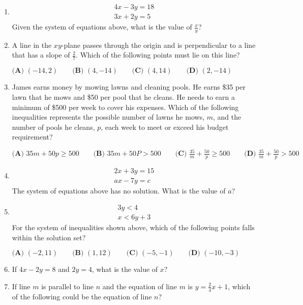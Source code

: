 \documentclass[../satmath.tex]{subfiles}
\begin{document}
\begin{enumerate}[label=\bfseries\arabic*.]
\item
\begin{align*}
4x-3y=18\\
3x+2y=5
\end{align*}
Given the system of equations above, what is the value of $\frac{x}{y}$?

\item A line in the $xy$-plane passes through the origin and is perpendicular to a line that has a slope of $\frac{2}{7}$. Which of the 
following points must lie on this line?

$\textbf{(A) } (-14,2) \qquad \textbf{(B) } (4,-14)\qquad \textbf{(C) } (4,14)\qquad \textbf{(D) } (2,-14)$ 

\item James earns money by mowing lawns and cleaning pools. He earns \$35 per lawn that he mows and \$50 per pool that he cleans. He needs to earn a 
minimum of \$500 per week to cover his expenses. Which of the following inequalities represents the possible number of lawns he mows, $m$,
and the number of pools he cleans, $p$, each week to meet or exceed his budget requirement?

$\textbf{(A) } 35m+50p \geq 500 \qquad \textbf{(B) }35m+50P > 500 \qquad \textbf{(C) }\frac{35}{m}+\frac{50}{p}\geq 500 \qquad \textbf{(D) }\frac{35}{m}+\frac{50}{p}>500$

\item 
\begin{align*}
2x+3y=15\\
ax-7y=c 
\end{align*}
The system of equations above has no solution. What is the value of $a$?

\item 
\begin{align*}
3y<4\\
x<6y+3
\end{align*}
For the system of inequalities shown above, which of the following points falls within the solution set?

$\textbf{(A) } (-2,11)\qquad \textbf{(B) } (1,12)\qquad \textbf{(C) } (-5,-1)\qquad \textbf{(D) } (-10,-3)$


\item If $4x-2y=8$ and $2y=4$, what is the value of $x$?

\item If line $m$ is parallel to line $n$ and the equation of line $m$ is $y=\frac{2}{3}x+1$, which of the following could be the equation of line $n$?
 

\end{enumerate}
\end{document}
